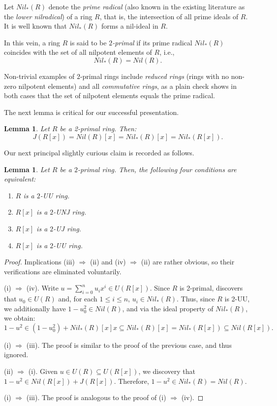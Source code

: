\documentclass[12pt]{amsart}
\newtheorem{lemma}[theorem]{Lemma}
\theoremstyle{definition}
\begin{document}
Let $Nil_*(R)$ denote the \textit{prime radical} (also known in the existing literature as the \textit{lower nilradical}) of a ring $R$, that is, the intersection of all prime ideals of $R$. It is well known that $Nil_*(R)$ forms a nil-ideal in $R$.

In this vein, a ring $R$ is said to be {\it $2$-primal} if its prime radical $Nil_*(R)$ coincides with the set of all nilpotent elements of $R$, i.e.,
\[
Nil_*(R) = Nil(R).
\]

Non-trivial examples of $2$-primal rings include \textit{reduced rings} (rings with no non-zero nilpotent elements) and all \textit{commutative rings}, as a plain check shows in both cases that the set of nilpotent elements equals the prime radical.

\medskip

The next lemma is critical for our successful presentation.

\begin{lemma}\cite[Corollary 3.2.]{daoa}\label{cor 2 primal}
Let $R$ be a 2-primal ring. Then:
\[ J(R[x]) = Nil(R)[x] = Nil_*(R)[x] = Nil_*(R[x]). \]
\end{lemma}

Our next principal slightly curious claim is recorded as follows.

\begin{lemma}\label{l4.8}
Let $R$ be a $2$-primal ring. Then, the following four conditions are equivalent:
\begin{enumerate}
\item
$R$ is a $2$-UU ring.
\item
$R[x]$ is a $2$-UNJ ring.
\item
$R[x]$ is a $2$-UJ ring.
\item
$R[x]$ is a $2$-UU ring.
\end{enumerate}
\end{lemma}

\begin{proof}
Implications (iii) $\Rightarrow$ (ii) and (iv) $\Rightarrow$ (ii) are rather obvious, so their verifications are eliminated voluntarily.
	
(i) $\Rightarrow$ (iv). Write $u = \sum_{i=0}^n u_ix^i \in U(R[x])$. Since $R$ is 2-primal, \cite[Theorem 2.5]{Chenpr} discovers that $u_0 \in U(R)$ and, for each $1 \leq i \leq n$, $u_i \in Nil_*(R)$. Thus, since $R$ is 2-UU, we additionally have $1-u_0^2 \in Nil(R)$, and via the ideal property of $Nil_*(R)$, we obtain:
\[
	1-u^2 \in (1-u_0^2) + Nil_*(R)[x]x \subseteq Nil_*(R)[x] = Nil_*(R[x]) \subseteq Nil(R[x]).
\]

(i) $\Rightarrow$ (iii). The proof is similar to the proof of the previous case, and thus ignored.
	
(ii) $\Rightarrow$ (i). Given $u \in U(R) \subseteq U(R[x])$, we discovery that $1-u^2 \in Nil(R[x])+J(R[x])$. Therefore, $1-u^2 \in Nil_*(R) = Nil(R)$.

(i) $\Rightarrow$ (iii). The proof is analogous to the proof of (i) $\Rightarrow$ (iv).
\end{proof}
\end{document}
